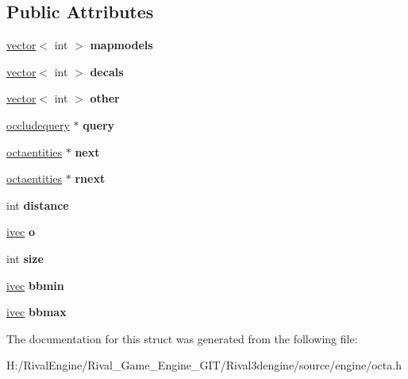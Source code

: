 \subsection*{Public Attributes}
\begin{DoxyCompactItemize}
\item 
\mbox{\label{structoctaentities_acb95fb45dc2cd8f1c3eecd700245b4fc}} 
\hyperlink{structvector}{vector}$<$ int $>$ {\bfseries mapmodels}
\item 
\mbox{\label{structoctaentities_a8d8784824474b76cb2951e72d960fa05}} 
\hyperlink{structvector}{vector}$<$ int $>$ {\bfseries decals}
\item 
\mbox{\label{structoctaentities_a0a239d505d9ab5f44522ddc9d149b2b7}} 
\hyperlink{structvector}{vector}$<$ int $>$ {\bfseries other}
\item 
\mbox{\label{structoctaentities_a4c55bfed4c9c14c53b5cfbbee72e5089}} 
\hyperlink{structoccludequery}{occludequery} $\ast$ {\bfseries query}
\item 
\mbox{\label{structoctaentities_a9a702a3fee75bd0ae3ef62a95ed523bd}} 
\hyperlink{structoctaentities}{octaentities} $\ast$ {\bfseries next}
\item 
\mbox{\label{structoctaentities_afdf2f4ba8762f27c19343708ddacd3ae}} 
\hyperlink{structoctaentities}{octaentities} $\ast$ {\bfseries rnext}
\item 
\mbox{\label{structoctaentities_ad2e5e3e5fdcabfa884b4212ac37caf1e}} 
int {\bfseries distance}
\item 
\mbox{\label{structoctaentities_a9ef756564343460e863e389e908abf3c}} 
\hyperlink{structivec}{ivec} {\bfseries o}
\item 
\mbox{\label{structoctaentities_a657d9d6af038526892bc6708f26a6084}} 
int {\bfseries size}
\item 
\mbox{\label{structoctaentities_a11c6f0fbe8a628f7c468b0e554300aaf}} 
\hyperlink{structivec}{ivec} {\bfseries bbmin}
\item 
\mbox{\label{structoctaentities_a67ebc59cec3eebc239c647f1fd166535}} 
\hyperlink{structivec}{ivec} {\bfseries bbmax}
\end{DoxyCompactItemize}


The documentation for this struct was generated from the following file\+:\begin{DoxyCompactItemize}
\item 
H\+:/\+Rival\+Engine/\+Rival\+\_\+\+Game\+\_\+\+Engine\+\_\+\+G\+I\+T/\+Rival3dengine/source/engine/octa.\+h\end{DoxyCompactItemize}

